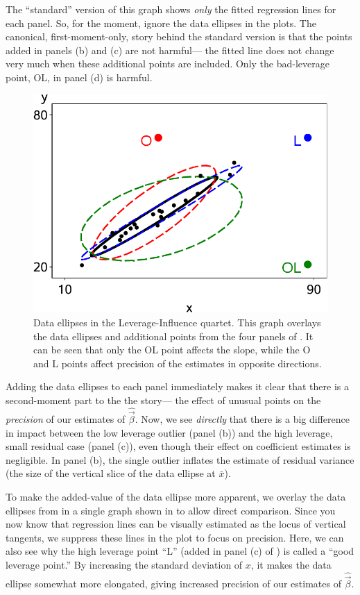 The ``standard'' version of this graph shows \emph{only} the fitted regression lines for each
panel. So, for the moment, ignore the data ellipses in the plots.
The canonical, first-moment-only, story behind the standard version is that the points added in panels
(b) and (c) are not harmful--- the fitted line does not change very much when these
additional points are included. Only the bad-leverage point, OL, in panel (d) is harmful.

\begin{figure}[htb!]
  \centering
  \includegraphics[width=.8\textwidth,clip]{fig/levdemo22}
  \caption{Data ellipses in the Leverage-Influence quartet. This graph overlays the data ellipses
  and additional points from the four panels of . It can be seen that only the
  OL point affects the slope, while the O and L points affect precision of the estimates in opposite
  directions.}%
  \label{fig:levdemo22}
\end{figure}

Adding the data ellipses to each panel immediately makes it clear that there is a second-moment
part to the the story--- the effect of unusual points on the \emph{precision} of our estimates
of $\hat{\vec{\beta}}$.  Now, 
we see \emph{directly} that there is a big difference in impact between 
the low leverage outlier (panel (b)) and the high leverage, small residual case (panel (c)),
even though their effect on coefficient estimates is negligible.
In panel (b), the single outlier inflates the estimate of residual variance (the size of the
vertical slice of the data ellipse at $\bar{x}$).

To make the added-value of the data ellipse more apparent, we overlay the data ellipses from
 in a single graph shown in 
 to allow direct comparison.  Since you now know that regression lines
can be visually estimated as the locus of vertical tangents, we suppress these lines in the
plot to focus on precision.  Here, we can also see why the high leverage 
point ``L'' (added in panel (c) of ) is called a ``good leverage point.''
By increasing the standard deviation of $x$, it makes the data ellipse somewhat more elongated,
giving increased precision of our estimates of $\hat{\vec{\beta}}$.

